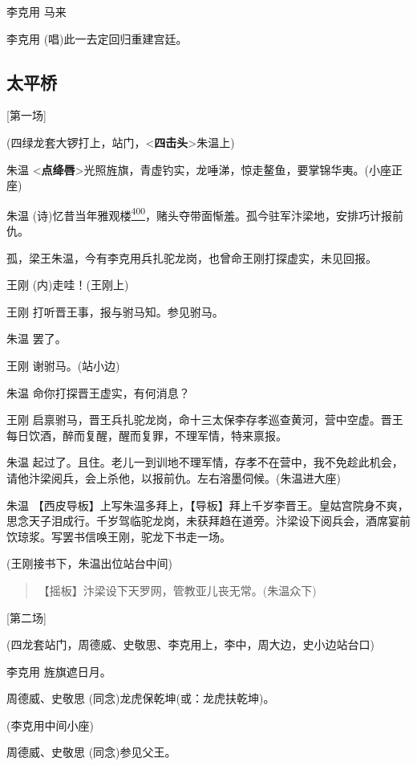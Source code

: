 李克用 马来

李克用 (唱)此一去定回归重建宫廷。

\hypertarget{ux592aux5e73ux6865}{%
\subsection{太平桥}\label{ux592aux5e73ux6865}}

{[}第一场{]}

(四绿龙套大锣打上，站门，\textless{}\textbf{四击头}\textgreater{}朱温上)

朱温
\textless{}\textbf{点绛唇}\textgreater{}光照旌旗，青虚钓实，龙唾涕，惊走鳌鱼，要掌锦华夷。(小座正座)

朱温
(诗)忆昔当年雅观楼\protect\hyperlink{fn400}{\textsuperscript{400}}，赌头夺带面惭羞。孤今驻军汴梁地，安排巧计报前仇。

孤，梁王朱温，今有李克用兵扎驼龙岗，也曾命王刚打探虚实，未见回报。

王刚 (内)走哇！(王刚上)

王刚 打听晋王事，报与驸马知。参见驸马。

朱温 罢了。

王刚 谢驸马。(站小边)

朱温 命你打探晋王虚实，有何消息？

王刚
启禀驸马，晋王兵扎驼龙岗，命十三太保李存孝巡查黄河，营中空虚。晋王每日饮酒，醉而复醒，醒而复罪，不理军情，特来禀报。

朱温
起过了。且住。老儿一到训地不理军情，存孝不在营中，我不免趁此机会，请他汴梁阅兵，会上杀他，以报前仇。左右溶墨伺候。(朱温进大座)

朱温
【西皮导板】上写朱温多拜上，【导板】拜上千岁李晋王。皇姑宫院身不爽，思念天子泪成行。千岁驾临驼龙岗，未获拜趋在道旁。汴梁设下阅兵会，酒席宴前饮琼浆。写罢书信唤王刚，驼龙下书走一场。

(王刚接书下，朱温出位站台中间)

\begin{quote}
【摇板】汴梁设下天罗网，管教亚儿丧无常。(朱温众下)
\end{quote}

{[}第二场{]}

(四龙套站门，周德威、史敬思、李克用上，李中，周大边，史小边站台口)

李克用 旌旗遮日月。

周德威、史敬思 (同念)龙虎保乾坤(或：龙虎扶乾坤)。

(李克用中间小座)

周德威、史敬思 (同念)参见父王。

